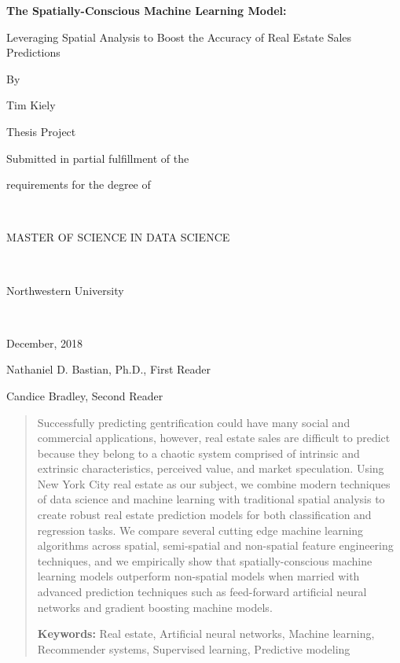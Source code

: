 \documentclass[12pt,]{article}
\title{}
\author{}
\date{}
\begin{document}

\titlepage
\center
\vspace{4 cm}
\normalsize

\bf 
The Spatially-Conscious Machine Learning Model:  

\normalsize

Leveraging Spatial Analysis to Boost the Accuracy of Real Estate Sales
Predictions

\rm
\normalsize

By

Tim Kiely

Thesis Project

Submitted in partial fulfillment of the

requirements for the degree of

~

MASTER OF SCIENCE IN DATA SCIENCE

~

Northwestern University

~

December, 2018

Nathaniel D. Bastian, Ph.D., First Reader

Candice Bradley, Second Reader

\newpage
\normalsize
\singlespace
\begin{abstract}

Successfully predicting gentrification could have many social and commercial applications, however, real estate sales are difficult to predict because they belong to a chaotic system comprised of intrinsic and extrinsic characteristics, perceived value, and market speculation. Using New York City real estate as our subject, we combine modern techniques of data science and machine learning with traditional spatial analysis to create robust real estate prediction models for both classification and regression tasks. We compare several cutting edge machine learning algorithms across spatial, semi-spatial and non-spatial feature engineering techniques, and we empirically show that spatially-conscious machine learning models outperform non-spatial models when married with advanced prediction techniques such as feed-forward artificial neural networks and gradient boosting machine models. 

\textbf{Keywords:} Real estate, Artificial neural networks, Machine learning, Recommender systems, Supervised learning, Predictive modeling

\end{abstract}
\end{document}

